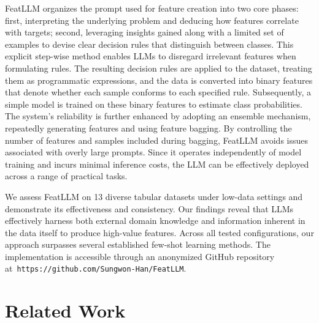 \textsf{FeatLLM} organizes the prompt used for feature creation into two core phases: first, interpreting the underlying problem and deducing how features correlate with targets; second, leveraging insights gained along with a limited set of examples to devise clear decision rules that distinguish between classes. This explicit step-wise method enables LLMs to disregard irrelevant features when formulating rules. The resulting decision rules are applied to the dataset, treating them as programmatic expressions, and the data is converted into binary features that denote whether each sample conforms to each specified rule. Subsequently, a simple model is trained on these binary features to estimate class probabilities. The system’s reliability is further enhanced by adopting an ensemble mechanism, repeatedly generating features and using feature bagging. By controlling the number of features and samples included during bagging, \textsf{FeatLLM} avoids issues associated with overly large prompts. Since it operates independently of model training and incurs minimal inference costs, the LLM can be effectively deployed across a range of practical tasks.

We assess \textsf{FeatLLM} on 13 diverse tabular datasets under low-data settings and demonstrate its effectiveness and consistency. Our findings reveal that LLMs effectively harness both external domain knowledge and information inherent in the data itself to produce high-value features. Across all tested configurations, our approach surpasses several established few-shot learning methods. The implementation is accessible through an anonymized GitHub repository at~\texttt{https://github.com/Sungwon-Han/FeatLLM}.

\section{Related Work}

